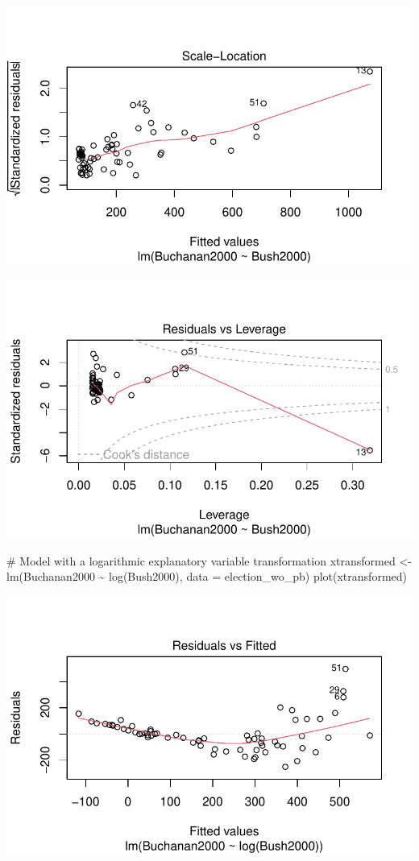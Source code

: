 \documentclass[
  letterpaper,
  DIV=11,
  numbers=noendperiod]{scrartcl}
\newenvironment{Shaded}{\begin{snugshade}}{\end{snugshade}}
\newcommand{\AttributeTok}[1]{\textcolor[rgb]{0.40,0.45,0.13}{#1}}
\newcommand{\CommentTok}[1]{\textcolor[rgb]{0.37,0.37,0.37}{#1}}
\newcommand{\FunctionTok}[1]{\textcolor[rgb]{0.28,0.35,0.67}{#1}}
\newcommand{\NormalTok}[1]{\textcolor[rgb]{0.00,0.23,0.31}{#1}}
\newcommand{\OtherTok}[1]{\textcolor[rgb]{0.00,0.23,0.31}{#1}}
\newcommand{\SpecialCharTok}[1]{\textcolor[rgb]{0.37,0.37,0.37}{#1}}
\begin{document}
\includegraphics{case_study_1_files/figure-pdf/unnamed-chunk-3-5.pdf}

\includegraphics{case_study_1_files/figure-pdf/unnamed-chunk-3-6.pdf}

\begin{Shaded}
\begin{Highlighting}[]
\CommentTok{\# Model with a logarithmic explanatory variable transformation}
\NormalTok{xtransformed }\OtherTok{\textless{}{-}} \FunctionTok{lm}\NormalTok{(Buchanan2000 }\SpecialCharTok{\textasciitilde{}} \FunctionTok{log}\NormalTok{(Bush2000), }\AttributeTok{data =}\NormalTok{ election\_wo\_pb)}
\FunctionTok{plot}\NormalTok{(xtransformed)}
\end{Highlighting}
\end{Shaded}

\includegraphics{case_study_1_files/figure-pdf/unnamed-chunk-3-7.pdf}
\end{document}
